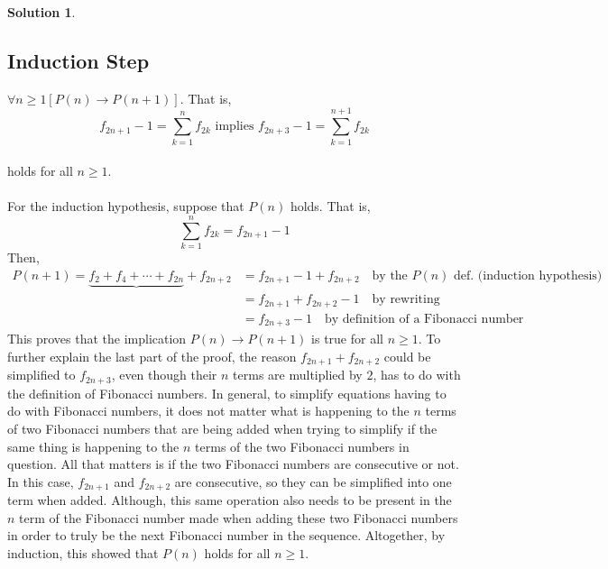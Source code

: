 \documentclass{article}
\theoremstyle{definition}
\newtheorem*{solution}{Solution}
\begin{document}
\begin{solution}
\subsection*{Induction Step}
$\forall n \geqslant 1[P(n) \rightarrow P(n+1)]$. That is,\\
$$ f_{2n+1} - 1 = \sum_{k=1}^{n} f_{2k} \mbox{ implies } f_{2n+3} - 1 = \sum_{k=1}^{n+1} f_{2k} $$\\
holds for all $n \geqslant 1$.\\\\
For the induction hypothesis, suppose that $P(n)$ holds. That is,\\
$$ \sum_{k=1}^{n} f_{2k} = f_{2n+1} - 1 $$ Then,
\begin{align*}
P(n+1) = \underbrace{f_2 + f_4 + \cdots + f_{2n}} + f_{2n+2} &= f_{2n+1} - 1 + f_{2n+2} \quad \mbox{by the $P(n)$ def. (induction hypothesis)}\\
&= f_{2n+1} + f_{2n+2} - 1 \quad \mbox{by rewriting}\\
&= f_{2n+3} - 1 \quad \mbox{by definition of a Fibonacci number}
\end{align*}
This proves that the implication $P(n) \rightarrow P(n+1)$ is true for all $n \geqslant 1$. To further explain the last part of the proof, the reason $f_{2n+1} + f_{2n+2}$ could be simplified to $f_{2n+3}$, even though their $n$ terms are multiplied by $2$, has to do with the definition of Fibonacci numbers. In general, to simplify equations having to do with Fibonacci numbers, it does not matter what is happening to the $n$ terms of two Fibonacci numbers that are being added when trying to simplify if the same thing is happening to the $n$ terms of the two Fibonacci numbers in question. All that matters is if the two Fibonacci numbers are consecutive or not. In this case, $f_{2n+1}$ and $f_{2n+2}$ are consecutive, so they can be simplified into one term when added. Although, this same operation also needs to be present in the $n$ term of the Fibonacci number made when adding these two Fibonacci numbers in order to truly be the next Fibonacci number in the sequence. Altogether, by induction, this showed that $P(n)$ holds for all $n \geqslant 1$.
\end{solution}
\end{document}
